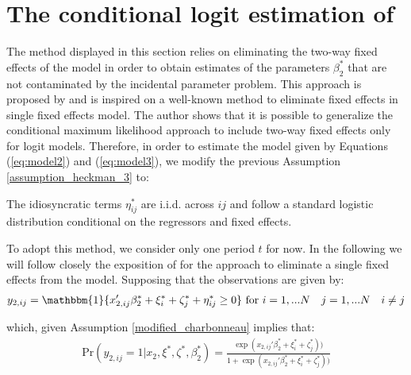 \section{The conditional logit estimation of \cite{charbonneau2017multiple}} \label{section_charbonneau}
The method displayed in this section relies on eliminating the two-way fixed effects of the model in order to obtain estimates of the parameters $\beta_2^*$ that are not contaminated by the incidental parameter problem. This approach is proposed by \cite{charbonneau2017multiple} and is inspired on a well-known method to eliminate fixed effects in single fixed effects model. The author shows that it is possible to generalize the conditional maximum likelihood approach to include two-way fixed effects only for logit models. Therefore, in order to estimate the model given by Equations (\ref{eq:model2}) and (\ref{eq:model3}), we modify the previous Assumption \ref{assumption_heckman_3} to:

\begin{assumption} \label{modified_charbonneau}
    The idiosyncratic terms $\eta_{ij}^*$ are i.i.d. across $ij$ and follow a standard logistic distribution conditional on the regressors and fixed effects.
\end{assumption}

To adopt this method, we consider only one period $t$ for now. In the following we will follow closely the exposition of \cite{arellano2001panel} for the approach to eliminate a single fixed effects from the model. Supposing that the observations are given by:
\begin{align*}
    y_{2,ij} = \mathbbm{1} \{ x_{2,ij}'{\beta_2^*}  +\xi_{i}^*+\zeta_{j}^* + \eta_{ij}^* \geq 0\} \text{ for } i=1,...N \quad j=1,...N \quad i \neq j
\end{align*}

\noindent which, given Assumption \ref{modified_charbonneau} implies that: 
\begin{align*}
\text{Pr}(y_{2,ij} = 1 \rvert x_{2}, \xi^*, \zeta^*, \beta_2^*) = \frac{\exp (x_{2,ij}'{\beta_2^*}  +\xi_{i}^*+\zeta_{j}^*))}{1 + \exp (x_{2,ij}'{\beta_2^*}  +\xi_{i}^*+\zeta_{j}^*))}
\end{align*}


